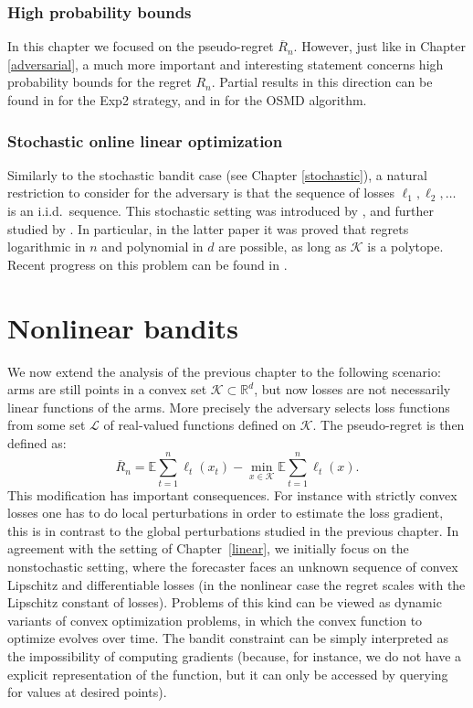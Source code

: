 \documentclass[11pt]{hackednow}
\newcommand{\E}{\mathbb{E}}
\newcommand{\R}{\mathbb{R}}
\newcommand{\cL}{\mathcal{L}}
\newcommand{\cK}{\mathcal{K}}
\newcommand{\oR}{\overline{R}}
\begin{document}
\subsection{High probability bounds} \label{sec:hplinear}
In this chapter we focused on the pseudo-regret $\oR_n$. However, just like in Chapter \ref{adversarial}, a much more important and interesting statement concerns high probability bounds for the regret $R_n$. Partial results in this direction can be found in \cite{BDHKRT08} for the Exp2 strategy, and in \cite{AR09} for the OSMD algorithm.

\subsection{Stochastic online linear optimization} \label{sec:stochlinear}
Similarly to the stochastic bandit case (see Chapter \ref{stochastic}), a natural restriction to consider for the adversary is that the sequence of losses $\ell_1,\ell_2,\ldots$ is an i.i.d.\ sequence. This stochastic setting was introduced by \cite{Aue02}, and further studied by \cite{DHK08b}. In particular, in the latter paper it was proved that regrets logarithmic in $n$ and polynomial in $d$ are possible, as long as $\cK$ is a polytope. Recent progress on this problem can be found in \cite{RT10, filippi2010parametric, APS11}.
 
\chapter{Nonlinear bandits}
\label{nonlinear}
We now extend the analysis of the previous chapter to the following scenario: arms are still points in a convex set $\cK \subset \R^d$, but now losses are not necessarily linear functions of the arms. More precisely the adversary selects loss functions from some set $\cL$ of real-valued functions defined on $\cK$. The pseudo-regret is then defined as:
$$\oR_n = \E \sum_{t=1}^n  \ell_t(x_t) - \min_{x \in \cK} \E \sum_{t=1}^n \ell_t(x) .$$
This modification has important consequences.
For instance with strictly convex losses one has to do local perturbations in order to estimate the loss gradient, this is in contrast to the global perturbations studied in the previous chapter.
In agreement with the setting of Chapter~\ref{linear}, we initially focus on the nonstochastic setting, where the forecaster faces an unknown sequence of convex Lipschitz and differentiable losses (in the nonlinear case the regret scales with the Lipschitz constant of losses). Problems of this kind can be viewed as dynamic variants of convex optimization problems, in which the convex function to optimize evolves over time. The bandit constraint can be simply interpreted as the impossibility of computing gradients (because, for instance, we do not have a explicit representation of the function, but it can only be accessed by querying for values at desired points).
\end{document}
